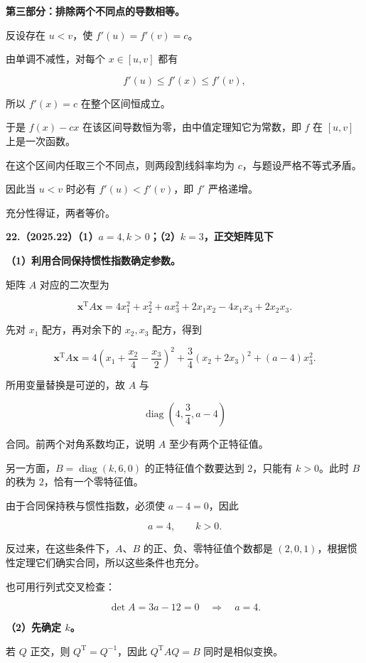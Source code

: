 \documentclass[UTF8,11pt,fontset=windows]{ctexart}
\begin{document}
\textbf{第三部分：排除两个不同点的导数相等。}

反设存在 $u<v$，使 $f'(u)=f'(v)=c$。

由单调不减性，对每个 $x\in[u,v]$ 都有

$$
f'(u)\le f'(x)\le f'(v),
$$

所以 $f'(x)=c$ 在整个区间恒成立。

于是 $f(x)-cx$ 在该区间导数恒为零，由中值定理知它为常数，即 $f$ 在 $[u,v]$ 上是一次函数。

在这个区间内任取三个不同点，则两段割线斜率均为 $c$，与题设严格不等式矛盾。

因此当 $u<v$ 时必有 $f'(u)<f'(v)$，即 $f'$ 严格递增。

充分性得证，两者等价。

\clearpage

\textbf{22.（2025.22）（1）$a=4,k>0$；（2）$k=3$，正交矩阵见下}

\textbf{（1）利用合同保持惯性指数确定参数。}

矩阵 $A$ 对应的二次型为

$$
\boldsymbol x^{\mathrm T}A\boldsymbol x
=4x_1^2+x_2^2+ax_3^2+2x_1x_2-4x_1x_3+2x_2x_3.
$$

先对 $x_1$ 配方，再对余下的 $x_2,x_3$ 配方，得到

$$
\boldsymbol x^{\mathrm T}A\boldsymbol x
=4\left(x_1+\frac{x_2}{4}-\frac{x_3}{2}\right)^2
+\frac34(x_2+2x_3)^2+(a-4)x_3^2.
$$

所用变量替换是可逆的，故 $A$ 与

$$
\operatorname{diag}\left(4,\frac34,a-4\right)
$$

合同。前两个对角系数均正，说明 $A$ 至少有两个正特征值。

另一方面，$B=\operatorname{diag}(k,6,0)$ 的正特征值个数要达到 $2$，只能有 $k>0$。此时 $B$ 的秩为 $2$，恰有一个零特征值。

由于合同保持秩与惯性指数，必须使 $a-4=0$，因此

$$
\boxed{a=4,\qquad k>0}.
$$

反过来，在这些条件下，$A$、$B$ 的正、负、零特征值个数都是 $(2,0,1)$，根据惯性定理它们确实合同，所以这些条件也充分。

也可用行列式交叉检查：

$$
\det A=3a-12=0\quad\Longrightarrow\quad a=4.
$$

\textbf{（2）先确定 $k$。}

若 $Q$ 正交，则 $Q^{\mathrm T}=Q^{-1}$，因此 $Q^{\mathrm T}AQ=B$ 同时是相似变换。
\end{document}
